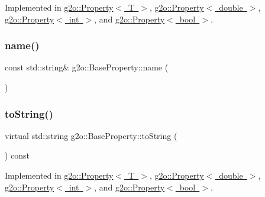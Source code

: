 Implemented in \mbox{\hyperlink{classg2o_1_1_property_a5c0a6eacc67e98d4f0b3fd9fe856dbbe}{g2o\+::\+Property$<$ T $>$}}, \mbox{\hyperlink{classg2o_1_1_property_a5c0a6eacc67e98d4f0b3fd9fe856dbbe}{g2o\+::\+Property$<$ double $>$}}, \mbox{\hyperlink{classg2o_1_1_property_a5c0a6eacc67e98d4f0b3fd9fe856dbbe}{g2o\+::\+Property$<$ int $>$}}, and \mbox{\hyperlink{classg2o_1_1_property_a5c0a6eacc67e98d4f0b3fd9fe856dbbe}{g2o\+::\+Property$<$ bool $>$}}.

\mbox{\label{classg2o_1_1_base_property_aae91313b0eb376dd9460cd712ecbb86d}} 
\subsubsection{\texorpdfstring{name()}{name()}}
{\footnotesize\ttfamily const std\+::string\& g2o\+::\+Base\+Property\+::name (\begin{DoxyParamCaption}{ }\end{DoxyParamCaption})\hspace{0.3cm}{\ttfamily [inline]}}

\mbox{\label{classg2o_1_1_base_property_a7a4191088468c2f03dab52107d130833}} 
\subsubsection{\texorpdfstring{to\+String()}{toString()}}
{\footnotesize\ttfamily virtual std\+::string g2o\+::\+Base\+Property\+::to\+String (\begin{DoxyParamCaption}{ }\end{DoxyParamCaption}) const\hspace{0.3cm}{\ttfamily [pure virtual]}}



Implemented in \mbox{\hyperlink{classg2o_1_1_property_a8e3d3f2f79d274384588a1a5b9198cf5}{g2o\+::\+Property$<$ T $>$}}, \mbox{\hyperlink{classg2o_1_1_property_a8e3d3f2f79d274384588a1a5b9198cf5}{g2o\+::\+Property$<$ double $>$}}, \mbox{\hyperlink{classg2o_1_1_property_a8e3d3f2f79d274384588a1a5b9198cf5}{g2o\+::\+Property$<$ int $>$}}, and \mbox{\hyperlink{classg2o_1_1_property_a8e3d3f2f79d274384588a1a5b9198cf5}{g2o\+::\+Property$<$ bool $>$}}.




